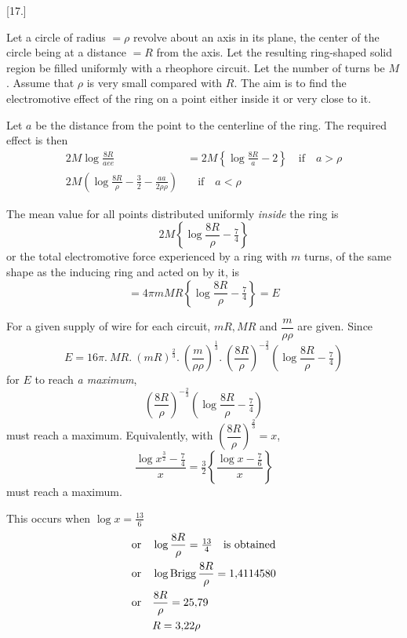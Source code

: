 \begin{center}[17.]\end{center}
Let a circle of radius $=\rho$ revolve about an axis in its plane, the center of the circle being at a distance $=R$ from the axis. Let the resulting ring-shaped solid region be filled uniformly with a rheophore circuit. Let the number of turns be $M$. Assume that $\rho$ is very small compared with $R$. The aim is to find the electromotive effect of the ring on a point either inside it or very close to it.
\begin{center}\end{center}

Let $a$ be the distance from the point to the centerline of the ring. The required effect is then
\[
\begin{aligned}
2M\log\frac{8R}{aee}&=2M\left\{\log\frac{8R}{a}-2\right\}\quad\text{if}\quad a>\rho\\
2M\left(\log\frac{8R}{\rho}-\tfrac32-\frac{aa}{2\rho\rho}\right)&\quad\text{if}\quad a<\rho
\end{aligned}
\]

The mean value for all points distributed uniformly \textit{inside} the ring is
\[
2M\left\{\log\frac{8R}{\rho}-\tfrac74\right\}
\]
or the total electromotive force experienced by a ring with $m$ turns, of the same shape as the inducing ring and acted on by it, is
\[
=4\pi mMR\left\{\log\frac{8R}{\rho}-\tfrac74\right\}=E
\]

For a given supply of wire for each circuit, $mR,MR$ and $\dfrac{m}{\rho\rho}$ are given. Since
\[
E=16\pi.\ MR.\ (mR)^{\frac23}.\ \left(\frac{m}{\rho\rho}\right)^{\frac13}.\ \left(\frac{8R}{\rho}\right)^{-\frac23}\left(\log\frac{8R}{\rho}-\tfrac74\right)
\]
for $E$ to reach \textit{a maximum},
\[
\left(\frac{8R}{\rho}\right)^{-\frac23}\left(\log\frac{8R}{\rho}-\tfrac74\right)
\]
must reach a maximum. Equivalently, with $\left(\dfrac{8R}{\rho}\right)^{\frac23}=x$,
\[
\frac{\log x^{\frac32}-\tfrac74}{x}=\tfrac32\left\{\frac{\log x-\tfrac76}{x}\right\}
\]
must reach a maximum.

This occurs when $\log x=\tfrac{13}{6}$
\[
\begin{aligned}
&\text{or}\quad\log\frac{8R}{\rho}=\tfrac{13}{4}\quad\text{is obtained}\\
&\text{or}\quad\log\operatorname{Brigg}\frac{8R}{\rho}=1{,}4114580\\
&\text{or}\quad\frac{8R}{\rho}=25{,}79\\
&\hphantom{\text{or}\quad}R=3{,}22\rho
\end{aligned}
\]

